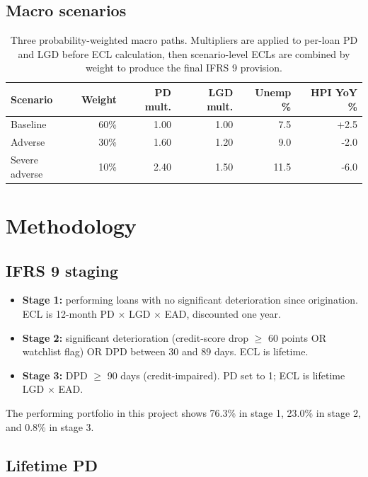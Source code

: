 \documentclass[a4paper,11pt]{article}
\begin{document}
\subsection{Macro scenarios}

\begin{table}[H]
\centering
\begin{tabular}{l r r r r r}
\toprule
\textbf{Scenario} & \textbf{Weight} & \textbf{PD mult.} & \textbf{LGD mult.} & \textbf{Unemp \%} & \textbf{HPI YoY \%} \\
\midrule
Baseline        & 60\% & 1.00 & 1.00 & 7.5  & +2.5 \\
Adverse         & 30\% & 1.60 & 1.20 & 9.0  & -2.0 \\
Severe adverse  & 10\% & 2.40 & 1.50 & 11.5 & -6.0 \\
\bottomrule
\end{tabular}
\caption{Three probability-weighted macro paths. Multipliers are
applied to per-loan PD and LGD before ECL calculation, then
scenario-level ECLs are combined by weight to produce the final
IFRS 9 provision.}
\end{table}

\section{Methodology}

\subsection{IFRS 9 staging}

\begin{itemize}
  \item \textbf{Stage 1:} performing loans with no significant
        deterioration since origination. ECL is 12-month PD $\times$
        LGD $\times$ EAD, discounted one year.
  \item \textbf{Stage 2:} significant deterioration
        (credit-score drop $\geq$ 60 points OR watchlist flag) OR
        DPD between 30 and 89 days. ECL is lifetime.
  \item \textbf{Stage 3:} DPD $\geq$ 90 days (credit-impaired). PD
        set to 1; ECL is lifetime LGD $\times$ EAD.
\end{itemize}

The performing portfolio in this project shows 76.3\% in stage 1,
23.0\% in stage 2, and 0.8\% in stage 3.

\subsection{Lifetime PD}
\end{document}
